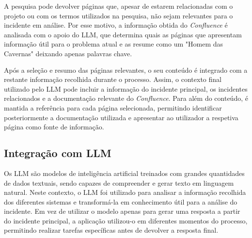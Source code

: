 		A pesquisa pode devolver páginas que, apesar de estarem relacionadas com o projeto ou com os termos utilizados na pesquisa, não sejam relevantes para o incidente em análise. Por esse motivo, a informação obtida do \textit{Confluence} é analisada com o apoio do \gls{LLM}, que determina quais as páginas que apresentam informação útil para o problema atual e as resume como um "Homem das Cavernas" deixando apenas palavras chave.
		
		Após a seleção e resumo das páginas relevantes, o seu conteúdo é integrado com a restante informação recolhida durante o processo. Assim, o contexto final utilizado pelo \gls{LLM} pode incluir a informação do incidente principal, os incidentes relacionados e a documentação relevante do \textit{Confluence}. Para além do conteúdo, é mantida a referência para cada página selecionada, permitindo identificar posteriormente a documentação utilizada e apresentar ao utilizador a respetiva página como fonte de informação.
	
	\subsection{Integração com LLM}
	
		
		
		Os \gls{LLM} são modelos de inteligência artificial treinados com grandes quantidades de dados textuais, sendo capazes de compreender e gerar texto em linguagem natural. Neste contexto, o \gls{LLM} foi utilizado para analisar a informação recolhida dos diferentes sistemas e transformá-la em conhecimento útil para a análise do incidente. Em vez de utilizar o modelo apenas para gerar uma resposta a partir do incidente principal, a aplicação utilizou-o em diferentes momentos do processo, permitindo realizar tarefas específicas antes de devolver a resposta final.
		
